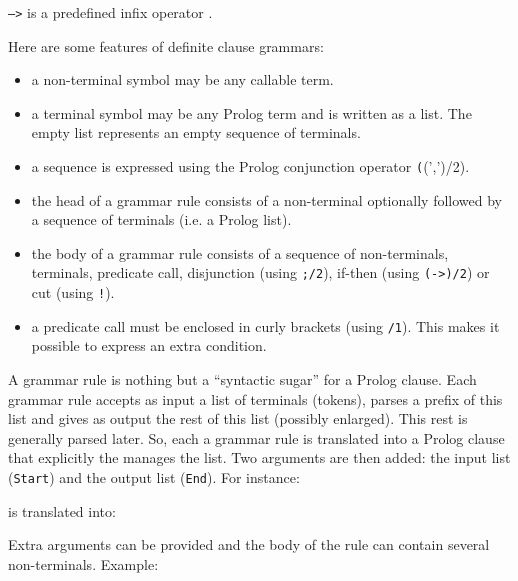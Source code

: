 
\texttt{-->} is a predefined infix operator .

Here are some features of definite clause grammars:

\begin{itemize}

\item a non-terminal symbol may be any callable term.

\item a terminal symbol may be any Prolog term and is written as a list. The
  empty list represents an empty sequence of terminals.

\item a sequence is expressed using the Prolog conjunction operator
  \texttt((',')/2).

\item the head of a grammar rule consists of a non-terminal optionally
  followed by a sequence of terminals (i.e. a Prolog list).

\item the body of a grammar rule consists of a sequence of non-terminals,
  terminals, predicate call, disjunction (using \texttt{;/2}), if-then (using
  \texttt{(->)/2}) or cut (using \texttt{!}).

\item a predicate call must be enclosed in curly brackets (using
  \texttt{{\lb}{\rb}/1}). This makes it possible to express an extra
  condition.

\end{itemize}

A grammar rule is nothing but a ``syntactic sugar'' for a Prolog clause. Each
grammar rule accepts as input a list of terminals (tokens), parses a prefix
of this list and gives as output the rest of this list (possibly enlarged).
This rest is generally parsed later. So, each a grammar rule is translated
into a Prolog clause that explicitly the manages the list. Two arguments
are then added: the input list (\texttt{Start}) and the output list
(\texttt{End}). For instance:


is translated into:


Extra arguments can be provided and the body of the rule can contain several
non-terminals. Example:

